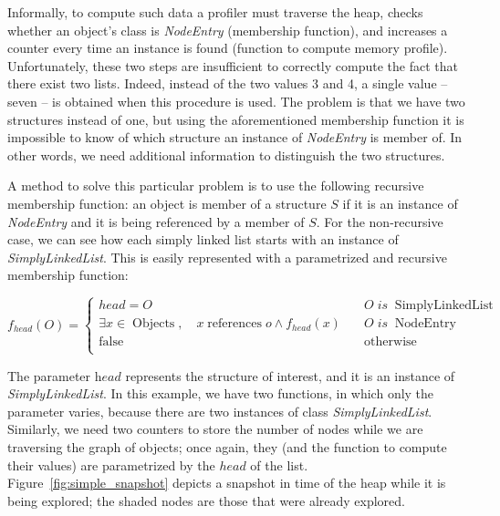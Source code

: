 Informally, to compute such data a profiler must traverse the heap, checks whether an object's class is \textit{NodeEntry} (membership function), and increases a counter every time an instance is found (function to compute memory profile).
Unfortunately, these two steps are insufficient to correctly compute the fact that there exist two lists.
Indeed,  instead of the two values 3 and 4, a single value -- seven -- is obtained when this procedure is used.
The problem is that we have two structures instead of one, but using the aforementioned membership function it is impossible to know of which structure an instance of \textit{NodeEntry} is member of.
In other words, we need additional information to distinguish the two structures.

A method to solve this particular problem is to use the following recursive membership function: an object is member of a structure $S$ if it is an instance of \textit{NodeEntry} and it is being referenced by a member of $S$.
For the non-recursive case, we can see how each simply linked list starts with an instance of \textit{SimplyLinkedList}.
This is easily represented with a parametrized and recursive membership function:

\begin{equation} \label{eq:simply-list}
	f_{head}\left(O\right) = 
	\begin{cases}
		head = O & \quad O \; is \; \operatorname{SimplyLinkedList} \\
		\exists {x \in \operatorname{Objects}}, \quad x \operatorname{references} o \wedge f_{head}\left(x\right) & \quad O \; is \; \operatorname{NodeEntry} \\
		\operatorname{false} & \quad \operatorname{otherwise} \\
	\end{cases}
\end{equation}

The parameter $\textit{head}$ represents the structure of interest, and it is an instance of \textit{SimplyLinkedList}.
In this example, we have two functions, in which only the parameter varies, because there are two instances of class \textit{SimplyLinkedList}.
Similarly, we need two counters to store the number of nodes while we are traversing the graph of objects; once again, they (and the function to compute their values) are parametrized by the $head$ of the list.
Figure~\ref{fig:simple_snapshot} depicts a snapshot in time of the heap while it is being explored;
the shaded nodes are those that were already explored.

